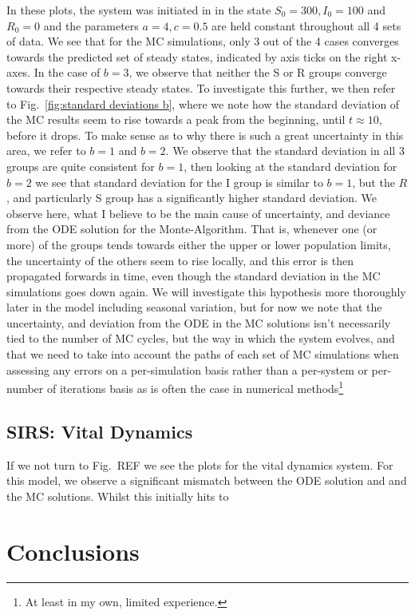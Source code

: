 \documentclass[10pt,showpacs,preprintnumbers,amsmath,amssymb,nofootinbib,aps,prl,twocolumn,groupedaddress,superscriptaddress,showkeys]{revtex4-1}
\begin{document}
    In these plots, the system was initiated in in the state $S_0 = 300, I_0=100$ and $R_0=0$ and the parameters $a=4, c=0.5$ are held constant throughout all 4 sets of data. We see that for the MC simulations, only 3 out of the 4 cases converges towards the predicted set of steady states, indicated by axis ticks on the right x-axes. In the case of $b=3$, we observe that neither the S or R groups converge towards their respective steady states. To investigate this further, we then refer to Fig.~\ref{fig:standard deviations b}, where we note how the standard deviation of the MC results seem to rise towards a peak from the beginning, until $t\approx10$, before it drops. To make sense as to why there is such a great uncertainty in this area, we refer to $b=1$ and $b=2$. We observe that the standard deviation in all 3 groups are quite consistent for $b=1$, then looking at the standard deviation for $b=2$  we see that standard deviation for the I group is similar to $b=1$, but the $R$, and particularly S group has a significantly higher standard deviation. We observe here, what I believe to be the main cause of uncertainty, and deviance from the ODE solution for the Monte-Algorithm. That is, whenever one (or more) of the groups tends towards either the upper or lower population limits, the uncertainty of the others seem to rise locally, and this error is then propagated forwards in time, even though the standard deviation in the MC simulations goes down again. We will investigate this hypothesis more thoroughly later in the model including seasonal variation, but for now we note that the uncertainty, and deviation from the ODE in the MC solutions isn't necessarily tied to the number of MC cycles, but the way in which the system evolves, and that we need to take into account the paths of each set of MC simulations when assessing any errors on a per-simulation basis rather than a per-system or per-number of iterations basis as is often the case in numerical methods\footnote{At least in my own, limited experience.}


  \subsection{SIRS: Vital Dynamics}
    If we not turn to Fig.~REF we see the plots for the vital dynamics system.
    For this model, we observe a significant mismatch between the ODE solution and
    and the MC solutions. Whilst this initially hits to 

\section{Conclusions}
\end{document}
